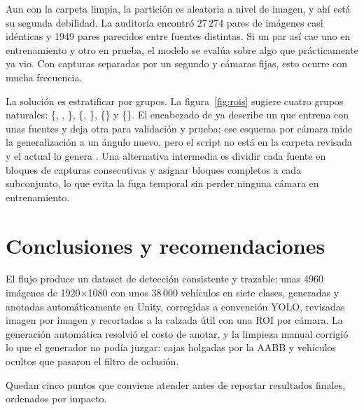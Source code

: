 \documentclass[11pt,a4paper]{article}
\begin{document}
Aun con la carpeta limpia, la partición es aleatoria a nivel de imagen, y ahí está su segunda debilidad. La auditoría encontró 27\,274 pares de imágenes casi idénticas y 1949 pares parecidos entre fuentes distintas. Si un par así cae uno en entrenamiento y otro en prueba, el modelo se evalúa sobre algo que prácticamente ya vio. Con capturas separadas por un segundo y cámaras fijas, esto ocurre con mucha frecuencia.

La solución es estratificar por grupos. La figura~\ref{fig:rois} sugiere cuatro grupos naturales: \{, , \}, \{, \}, \{\} y \{\}. El encabezado de  ya describe un  que entrena con unas fuentes y deja otra para validación y prueba; ese esquema por cámara mide la generalización a un ángulo nuevo, pero el script no está en la carpeta revisada y el  actual lo genera . Una alternativa intermedia es dividir cada fuente en bloques de capturas consecutivas y asignar bloques completos a cada subconjunto, lo que evita la fuga temporal sin perder ninguna cámara en entrenamiento.

\section{Conclusiones y recomendaciones}

El flujo produce un dataset de detección consistente y trazable: unas 4960 imágenes de 1920$\times$1080 con unos 38\,000 vehículos en siete clases, generadas y anotadas automáticamente en Unity, corregidas a convención YOLO, revisadas imagen por imagen y recortadas a la calzada útil con una ROI por cámara. La generación automática resolvió el costo de anotar, y la limpieza manual corrigió lo que el generador no podía juzgar: cajas holgadas por la AABB y vehículos ocultos que pasaron el filtro de oclusión.

Quedan cinco puntos que conviene atender antes de reportar resultados finales, ordenados por impacto.
\end{document}

